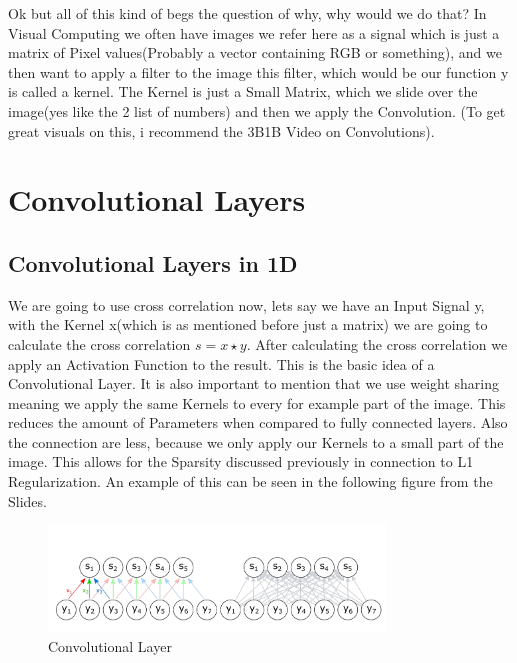 \documentclass[a4paper]{article}
\begin{document}
Ok but all of this kind of begs the question of why, why would we do that? In Visual Computing we often have images we refer here as a signal which is just a matrix of Pixel values(Probably a vector containing RGB or something), and we then want to apply a filter to the image this filter, which would be our function y is called a kernel. The Kernel is just a Small Matrix, which we slide over the image(yes like the 2 list of numbers) 
and then we apply the Convolution. (To get great visuals on this, i recommend the 3B1B Video on Convolutions). 
\newpage
\section{Convolutional Layers}
\subsection{Convolutional Layers in 1D}
We are going to use cross correlation now, lets say we have an Input Signal y, with the Kernel x(which is as mentioned before just a matrix) we are going to calculate the cross correlation $s = x \star y$. After calculating the cross correlation we apply an Activation Function to the result. This is the basic idea of a Convolutional Layer. It is also important to mention that we use weight sharing 
meaning we apply the same Kernels to every for example part of the image. This reduces the amount of Parameters when compared to fully connected layers. Also the connection are less, because we only apply our Kernels to a small part of the image.  This allows for the Sparsity discussed previously in connection to L1 Regularization.  An example of this can be seen in the following figure from the Slides.
\begin{figure}[h]
    \centering
    \includegraphics[width=0.8\textwidth]{images/convolutionalvsfullyconnected.png}
    \caption{Convolutional Layer}
    \label{fig:Convolutional Layer vs Fully Connected Layer}
\end{figure}
\end{document}
